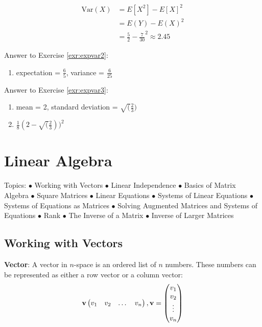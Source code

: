 \documentclass[]{book}
\providecommand{\tightlist}{%
  \setlength{\itemsep}{0pt}\setlength{\parskip}{0pt}}
\theoremstyle{definition}
\theoremstyle{definition}
\theoremstyle{definition}
\theoremstyle{remark}
\begin{document}
\begin{align*}
\text{Var}(X) &= E[X^2] - E[X]^2\\
&= E(Y) - E(X)^2\\
&= \frac{5}{2} - \frac{7}{30}^2 \approx 2.45
\end{align*}

Answer to Exercise \ref{exr:expvar2}:

\begin{enumerate}
\def\labelenumi{\arabic{enumi}.}
\tightlist
\item
  expectation = \(\frac{6}{5}\), variance = \(\frac{6}{25}\)
\end{enumerate}

Answer to Exercise \ref{exr:expvar3}:

\begin{enumerate}
\def\labelenumi{\arabic{enumi}.}
\item
  mean = 2, standard deviation = \(\sqrt(\frac{2}{3})\)
\item
  \(\frac{1}{8}(2 - \sqrt(\frac{2}{3}))^2\)
\end{enumerate}

\chapter{Linear Algebra}\label{linearalgebra}

Topics: \(\bullet\) Working with Vectors \(\bullet\) Linear Independence
\(\bullet\) Basics of Matrix Algebra \(\bullet\) Square Matrices
\(\bullet\) Linear Equations \(\bullet\) Systems of Linear Equations
\(\bullet\) Systems of Equations as Matrices \(\bullet\) Solving
Augmented Matrices and Systems of Equations \(\bullet\) Rank \(\bullet\)
The Inverse of a Matrix \(\bullet\) Inverse of Larger Matrices

\section{Working with Vectors}\label{vector-def}

\textbf{Vector}: A vector in \(n\)-space is an ordered list of \(n\)
numbers. These numbers can be represented as either a row vector or a
column vector:
\[ {\bf v} \begin{pmatrix} v_1 & v_2 & \dots & v_n\end{pmatrix} , {\bf v} = \begin{pmatrix} v_1 \\ v_2 \\ \vdots \\ v_n \end{pmatrix}\]
\end{document}
